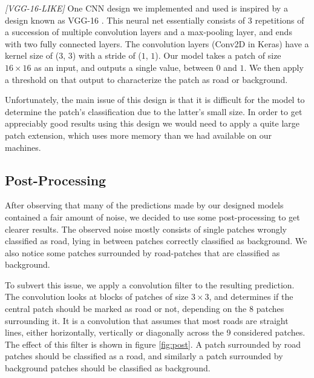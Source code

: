 \documentclass[10pt,conference,compsocconf]{IEEEtran}
\begin{document}
\textit{[VGG-16-LIKE]}
One CNN design we implemented and used is inspired by a design known as VGG-16 \cite{vgg}. This neural net essentially consists of 3 repetitions of a succession of multiple convolution layers and a max-pooling layer, and ends with two fully connected layers. The convolution layers (Conv2D in Keras) have a kernel size of ($3$, $3$) with a stride of ($1$, $1$). Our model takes a patch of size $16 \times 16$ as an input, and outputs a single value, between $0$ and $1$. We then apply a threshold on that output to characterize the patch as road or background.

Unfortunately, the main issue of this design is that it is difficult for the model to determine the patch's classification due to the latter's small size. In order to get appreciably good results using this design we would need to apply a quite large patch extension, which uses more memory than we had available on our machines.


\subsection{Post-Processing} 
\label{ssec:post}

After observing that many of the predictions made by our designed models contained a fair amount of noise, we decided to use some post-processing to get clearer results. The observed noise mostly consists of single patches wrongly classified as road, lying in between patches correctly classified as background. We also notice some patches surrounded by road-patches that are classified as background.

To subvert this issue, we apply a convolution filter to the resulting prediction. The convolution looks at blocks of patches of size $3 \times 3$, and determines if the central patch should be marked as road or not, depending on the $8$ patches surrounding it. It is a convolution that assumes that most roads are straight lines, either horizontally, vertically or diagonally across the 9 considered patches. The effect of this filter is shown in figure \ref{fig:post}. A patch surrounded by road patches should be classified as a road, and similarly a patch surrounded by background patches should be classified as background.
\end{document}
